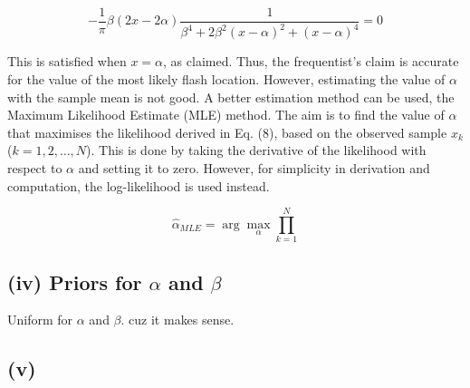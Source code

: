\documentclass[12pt]{report} %
\begin{document}
\begin{equation}
    -\frac{1}{\pi} \beta (2x - 2\alpha)\frac{1}{\beta^{4} + 2\beta^{2}(x - \alpha)^{2} + (x - \alpha)^{4}} = 0
\end{equation}

This is satisfied when $x = \alpha$, as claimed. Thus, the frequentist's claim is accurate for the value of the most likely flash location. However, estimating the value of $\alpha$ with the sample mean is not good. A better estimation method can be used, the Maximum Likelihood Estimate (MLE) method. The aim is to find the value of $\alpha$ that maximises the likelihood derived in Eq. (8), based on the observed sample ${x_k}$ ($k = 1, 2,\dots, N$).  This is done by taking the derivative of the likelihood with respect to $\alpha$ and setting it to zero. However, for simplicity in derivation and computation, the log-likelihood is used instead. 

\begin{equation}
    \hat{\alpha}_{MLE} = \arg \max_{\alpha} \prod_{k=1}^{N}
\end{equation}


\subsection*{(iv) Priors for $\alpha$ and $\beta$}

Uniform for $\alpha$ and $\beta$. cuz it makes sense.

\subsection*{(v) }
\end{document}
